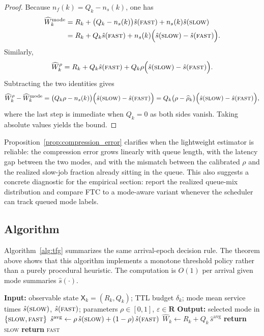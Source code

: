 \documentclass[fleqn,12pt,lineno]{wlpeerj}
\begin{document}
\begin{proof}
Because $n_f(k)=Q_k-n_s(k)$, one has
\begin{align*}
\widehat W_k^{\mathrm{mode}}
&= R_k + \bigl(Q_k-n_s(k)\bigr)\hat{s}(\textsc{fast}) + n_s(k)\hat{s}(\textsc{slow}) \\
&= R_k + Q_k\hat{s}(\textsc{fast}) + n_s(k)\Bigl(\hat{s}(\textsc{slow})-\hat{s}(\textsc{fast})\Bigr).
\end{align*}
Similarly,
\[
\widehat W_k^{\rho}
= R_k + Q_k\hat{s}(\textsc{fast}) + Q_k\rho\Bigl(\hat{s}(\textsc{slow})-\hat{s}(\textsc{fast})\Bigr).
\]
Subtracting the two identities gives
\[
\widehat W_k^{\rho} - \widehat W_k^{\mathrm{mode}}
= \bigl(Q_k\rho - n_s(k)\bigr)\Bigl(\hat{s}(\textsc{slow})-\hat{s}(\textsc{fast})\Bigr)
= Q_k\bigl(\rho-\widehat\rho_k\bigr)\Bigl(\hat{s}(\textsc{slow})-\hat{s}(\textsc{fast})\Bigr),
\]
where the last step is immediate when $Q_k=0$ as both sides vanish. Taking absolute values yields the bound.
\end{proof}

Proposition~\ref{prop:compression_error} clarifies when the lightweight estimator is reliable: the compression error grows linearly with queue length, with the latency gap between the two modes, and with the mismatch between the calibrated $\rho$ and the realized slow-job fraction already sitting in the queue. This also suggests a concrete diagnostic for the empirical section: report the realized queue-mix distribution and compare FTC to a mode-aware variant whenever the scheduler can track queued mode labels.

\subsection{Algorithm}
\label{sec:tfg_algorithm}

Algorithm~\ref{alg:tfg} summarizes the same arrival-epoch decision rule. The theorem above shows that this algorithm implements a monotone threshold policy rather than a purely procedural heuristic. The computation is $O(1)$ per arrival given mode summaries $\hat{s}(\cdot)$.

\begin{algorithm}[t]
\caption{FTC (Firm-Deadline Tool Control) at request arrival (defaults: $\rho=0.55$, $\varepsilon=0$).}
\label{alg:tfg}
\begin{algorithmic}[1]
\STATE \textbf{Input:} observable state $\mathsf{X}_k=(R_k,Q_k)$; TTL budget $\delta_k$; mode mean service times $\hat{s}(\textsc{slow})$, $\hat{s}(\textsc{fast})$; parameters $\rho\in[0,1]$, $\varepsilon\in \mathbf{R}$
\STATE \textbf{Output:} selected mode in $\{\textsc{slow},\textsc{fast}\}$
\STATE $\hat{s}^{\mathrm{avg}} \gets \rho\,\hat{s}(\textsc{slow}) + (1-\rho)\,\hat{s}(\textsc{fast})$
\STATE $\widehat{W}_k \gets R_k + Q_k\,\hat{s}^{\mathrm{avg}}$
    \STATE \textbf{return} \textsc{slow}
\ELSE
    \STATE \textbf{return} \textsc{fast}
\ENDIF
\end{algorithmic}
\end{algorithm}
\end{document}
